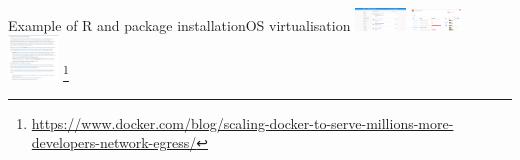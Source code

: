 \begin{frame}{Example of R and package installation}{OS virtualisation}
\includegraphics[width=0.1\textwidth]{images/docker_hub.png} 
\includegraphics[width=0.1\textwidth]{images/singularity_hub.png}
\includegraphics[width=0.1\textwidth]{images/docker_retention.png}
\footnote{\url{https://www.docker.com/blog/scaling-docker-to-serve-millions-more-developers-network-egress/}}
\end{frame}